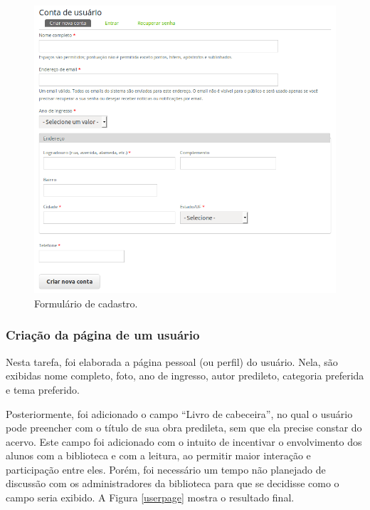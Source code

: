 \documentclass[a4paper]{article}
\begin{document}
\begin{figure}[pbth!]
\centering
\includegraphics[width=140mm]{img/newuser.png}
\caption{Formulário de cadastro.\label{cadastro}}
\end{figure}

\subsubsection{Criação da página de um usuário}

Nesta tarefa, foi elaborada a página pessoal (ou perfil) do usuário. Nela, são exibidas nome completo, foto, ano de ingresso, autor predileto, categoria preferida e tema preferido.

Posteriormente, foi adicionado o campo “Livro de cabeceira”, no qual o usuário pode preencher com o título de sua obra predileta, sem que ela precise constar do acervo. Este campo foi adicionado com o intuito de incentivar o envolvimento dos alunos com a biblioteca e com a leitura, ao permitir maior interação e participação entre eles. Porém, foi necessário um tempo não planejado de discussão com os administradores da biblioteca para que se decidisse como o campo seria exibido. A Figura \ref{userpage} mostra o resultado final.
\end{document}
